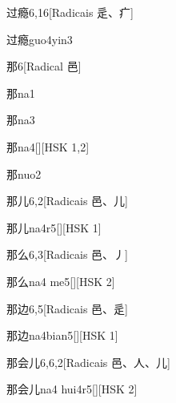 \begin{entry}{过瘾}{6,16}[Radicais ⾡、⽧]
  \begin{phonetics}{过瘾}{guo4yin3}
  \end{phonetics}
\end{entry}

\begin{entry}{那}{6}[Radical ⾢]
  \begin{phonetics}{那}{na1}
  \end{phonetics}
  \begin{phonetics}{那}{na3}
  \end{phonetics}
  \begin{phonetics}{那}{na4}[][HSK 1,2]
  \end{phonetics}
  \begin{phonetics}{那}{nuo2}
  \end{phonetics}
\end{entry}

\begin{entry}{那儿}{6,2}[Radicais ⾢、⼉]
  \begin{phonetics}{那儿}{na4r5}[][HSK 1]
  \end{phonetics}
\end{entry}

\begin{entry}{那么}{6,3}[Radicais ⾢、⼃]
  \begin{phonetics}{那么}{na4 me5}[][HSK 2]
  \end{phonetics}
\end{entry}

\begin{entry}{那边}{6,5}[Radicais ⾢、⾡]
  \begin{phonetics}{那边}{na4bian5}[][HSK 1]
  \end{phonetics}
\end{entry}

\begin{entry}{那会儿}{6,6,2}[Radicais ⾢、⼈、⼉]
  \begin{phonetics}{那会儿}{na4 hui4r5}[][HSK 2]
  \end{phonetics}
\end{entry}

